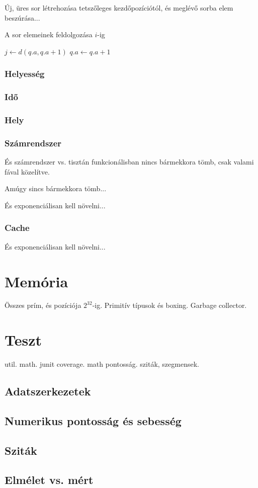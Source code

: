 Új, üres sor létrehozása tetszőleges kezdőpozíciótól, és meglévő sorba elem beszúrása...

A sor elemeinek feldolgozása $i$-ig
\begin{algorithmic}[1]
	\State $j \gets d(q.a, q.a + 1)$
	\State $q.a \gets q.a + 1$
		\State {}
			\State {}
		\Else
			\State {}
		\EndIf
	\EndFor
\EndWhile
\end{algorithmic}

\subsubsection{Helyesség}

\subsubsection{Idő}

\subsubsection{Hely}

\subsubsection{Számrendszer}

És számrendszer vs. tisztán funkcionálisban nincs bármekkora tömb, csak valami fával közelítve.

Amúgy sincs bármekkora tömb...

És exponenciálisan kell növelni...

\subsubsection{Cache}

És exponenciálisan kell növelni...

\section{Memória}

Összes prím, és pozíciója $2^32$-ig. Primitív típusok és boxing. Garbage collector.

\section{Teszt}

{\color{red} util. math. junit coverage.
math pontosság.
sziták, szegmensek.}

\subsection{Adatszerkezetek}

\subsection{Numerikus pontosság és sebesség}

\subsection{Sziták}

\subsection{Elmélet vs. mért}
